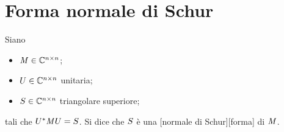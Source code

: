 \section{Forma normale di Schur}
\label{MetodiNumericiPerSistemiLineari_FormaNormaleDiSchur}
\begin{Definition}
  Siano
  \begin{itemize}
    \item $\mathit{M} \in \mathbb{C}^{n \times n}$;
    \item $U \in \mathbb{C}^{n \times n}$ unitaria;
    \item $S \in \mathbb{C}^{n \times n}$ triangolare
      superiore;
  \end{itemize}
  tali che ${U}^* \mathit{M} U = S$.
  Si dice che $S$ \`e una
  [normale di Schur][forma] di $\mathit{M}$.
\end{Definition}
